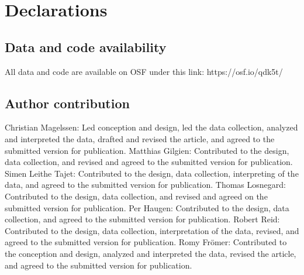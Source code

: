 \documentclass[pdflatex,sn-nature]{sn-jnl}%
\theoremstyle{thmstyleone}%
\theoremstyle{thmstyletwo}%
\theoremstyle{thmstylethree}%
\begin{document}
\section*{Declarations}





\subsection{Data and code availability}
All data and code are available on OSF under this link: https://osf.io/qdk5t/

\subsection{Author contribution}
Christian Magelssen: Led conception and design, led the data collection, analyzed and interpreted the data, drafted and revised the article, and agreed to the submitted version for publication. Matthias Gilgien: Contributed to the design, data collection, and revised and agreed to the submitted version for publication. Simen Leithe Tajet: Contributed to the design, data collection, interpreting of the data, and agreed to the submitted version for publication. Thomas Losnegard: Contributed to the design, data collection, and revised and agreed on the submitted version for publication. Per Haugen: Contributed to the design, data collection, and agreed to the submitted version for publication. Robert Reid: Contributed to the design, data collection, interpretation of the data, revised, and agreed to the submitted version for publication. Romy Frömer: Contributed to the conception and design, analyzed and interpreted the data, revised the article, and agreed to the submitted version for publication.
\end{document}
